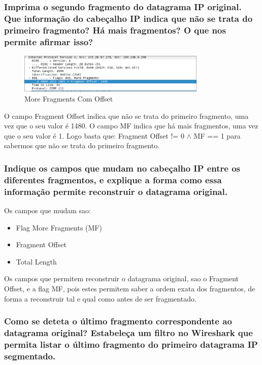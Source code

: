 \documentclass{article}
\begin{document}
\subsubsection{Imprima o segundo fragmento do datagrama IP original. Que informação
do cabeçalho IP indica que não se trata do primeiro fragmento? Há mais
fragmentos? O que nos permite afirmar isso?}

\begin{figure}[h]
    \centering
    \includegraphics[width=0.8\textwidth]{images/mf_offset.png}
    \caption{\label{fig:more_fragments_offset}More Fragments Com Offset}
\end{figure}

O campo Fragment Offset indica que não se trata do primeiro fragmento, uma vez que o seu valor é 1480. O campo MF indica que há mais fragmentos, uma vez que o seu valor é 1.
Logo basta que: Fragment Offset != 0 $\wedge$ MF == 1 para sabermos que não se trata do primeiro fragmento.

\subsubsection{Indique os campos que mudam no cabeçalho IP entre os diferentes
fragmentos, e explique a forma como essa informação permite
reconstruir o datagrama original.}

Os campos que mudam sao:
\begin{itemize}
    \item Flag More Fragments (MF)
    \item Fragment Offset
    \item Total Length
\end{itemize}
Os campos que permitem reconstruir o datagrama original, sao o Fragment Offset, e a flag MF, pois estes permitem saber a ordem exata dos fragmentos, de forma a reconstruir tal e qual como antes de ser fragmentado.

\subsubsection{Como se deteta o último fragmento correspondente ao datagrama
original? Estabeleça um filtro no Wireshark que permita listar o último
fragmento do primeiro datagrama IP segmentado.}
\end{document}
